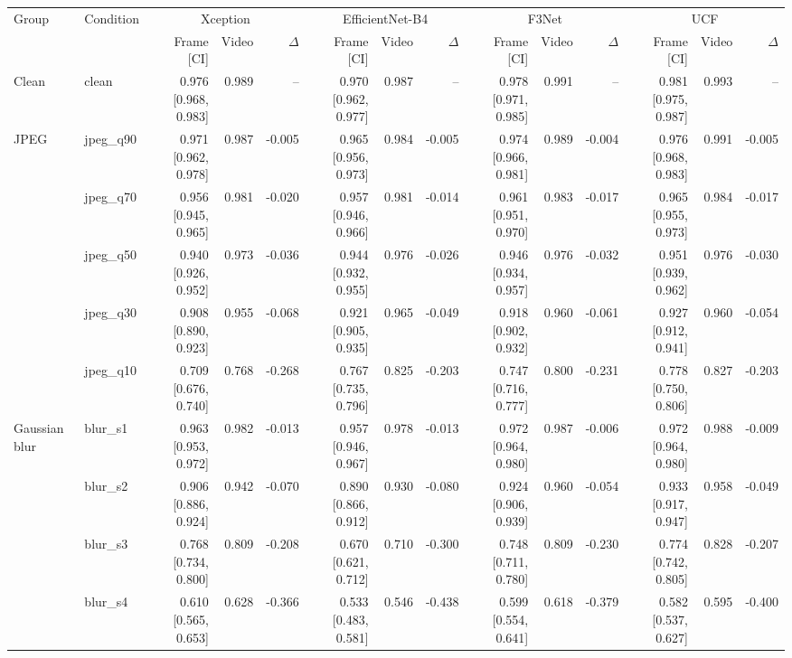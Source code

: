 \begin{tabular}{llrrrrrrrrrrrr}
\toprule
Group & Condition & \multicolumn{3}{c}{Xception} & \multicolumn{3}{c}{EfficientNet-B4} & \multicolumn{3}{c}{F3Net} & \multicolumn{3}{c}{UCF} \\
 & & Frame [CI] & Video & $\Delta$ & Frame [CI] & Video & $\Delta$ & Frame [CI] & Video & $\Delta$ & Frame [CI] & Video & $\Delta$ \\
\midrule
Clean & clean & 0.976 [0.968, 0.983] & 0.989 & -- & 0.970 [0.962, 0.977] & 0.987 & -- & 0.978 [0.971, 0.985] & 0.991 & -- & 0.981 [0.975, 0.987] & 0.993 & -- \\
JPEG & jpeg\_q90 & 0.971 [0.962, 0.978] & 0.987 & -0.005 & 0.965 [0.956, 0.973] & 0.984 & -0.005 & 0.974 [0.966, 0.981] & 0.989 & -0.004 & 0.976 [0.968, 0.983] & 0.991 & -0.005 \\
 & jpeg\_q70 & 0.956 [0.945, 0.965] & 0.981 & -0.020 & 0.957 [0.946, 0.966] & 0.981 & -0.014 & 0.961 [0.951, 0.970] & 0.983 & -0.017 & 0.965 [0.955, 0.973] & 0.984 & -0.017 \\
 & jpeg\_q50 & 0.940 [0.926, 0.952] & 0.973 & -0.036 & 0.944 [0.932, 0.955] & 0.976 & -0.026 & 0.946 [0.934, 0.957] & 0.976 & -0.032 & 0.951 [0.939, 0.962] & 0.976 & -0.030 \\
 & jpeg\_q30 & 0.908 [0.890, 0.923] & 0.955 & -0.068 & 0.921 [0.905, 0.935] & 0.965 & -0.049 & 0.918 [0.902, 0.932] & 0.960 & -0.061 & 0.927 [0.912, 0.941] & 0.960 & -0.054 \\
 & jpeg\_q10 & 0.709 [0.676, 0.740] & 0.768 & -0.268 & 0.767 [0.735, 0.796] & 0.825 & -0.203 & 0.747 [0.716, 0.777] & 0.800 & -0.231 & 0.778 [0.750, 0.806] & 0.827 & -0.203 \\
Gaussian blur & blur\_s1 & 0.963 [0.953, 0.972] & 0.982 & -0.013 & 0.957 [0.946, 0.967] & 0.978 & -0.013 & 0.972 [0.964, 0.980] & 0.987 & -0.006 & 0.972 [0.964, 0.980] & 0.988 & -0.009 \\
 & blur\_s2 & 0.906 [0.886, 0.924] & 0.942 & -0.070 & 0.890 [0.866, 0.912] & 0.930 & -0.080 & 0.924 [0.906, 0.939] & 0.960 & -0.054 & 0.933 [0.917, 0.947] & 0.958 & -0.049 \\
 & blur\_s3 & 0.768 [0.734, 0.800] & 0.809 & -0.208 & 0.670 [0.621, 0.712] & 0.710 & -0.300 & 0.748 [0.711, 0.780] & 0.809 & -0.230 & 0.774 [0.742, 0.805] & 0.828 & -0.207 \\
 & blur\_s4 & 0.610 [0.565, 0.653] & 0.628 & -0.366 & 0.533 [0.483, 0.581] & 0.546 & -0.438 & 0.599 [0.554, 0.641] & 0.618 & -0.379 & 0.582 [0.537, 0.627] & 0.595 & -0.400 \\

\end{tabular}

